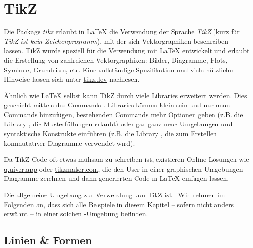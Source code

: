 \section{TikZ}

Die Package \emph{tikz} erlaubt in \LaTeX{} die Verwendung der Sprache \emph{TikZ} (kurz für \emph{TikZ ist kein Zeichenprogramm}), mit der sich Vektorgraphiken beschreiben lassen.
TikZ wurde speziell für die Verwendung mit \LaTeX{} entwickelt und erlaubt die Erstellung von zahlreichen Vektorgraphiken: Bilder, Diagramme, Plots, Symbole, Grundrisse, etc.
Eine vollständige Spezifikation und viele nützliche Hinweise lassen sich unter \url{tikz.dev} nachlesen.

Ähnlich wie \LaTeX{} selbst kann TikZ durch viele Libraries erweitert werden.
Dies geschieht mittels des Commands .
Libraries können klein sein und nur neue Commands hinzufügen, bestehenden Commands mehr Optionen geben (z.B. die Library , die Musterfüllungen erlaubt) oder gar ganz neue Umgebungen und syntaktische Konstrukte einführen (z.B. die Library , die zum Erstellen kommutativer Diagramme verwendet wird).

Da TikZ-Code oft etwas mühsam zu schreiben ist, existieren Online-Lösungen wie \url{q.uiver.app} oder \url{tikzmaker.com}, die den User in einer graphischen Umgebungen Diagramme zeichnen und dann generierten Code in \LaTeX{} einfügen lassen.

Die allgemeine Umgebung zur Verwendung von TikZ ist .
Wir nehmen im Folgenden an, dass sich alle Beispiele in diesem Kapitel -- sofern nicht anders erwähnt -- in einer solchen -Umgebung befinden.

\subsection{Linien \& Formen}

